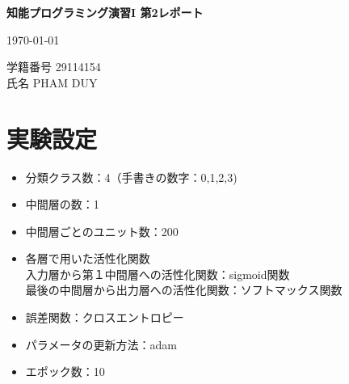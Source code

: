\documentclass{jarticle}
\begin{document}

\begin{center} 
{\large \bf 知能プログラミング演習I 第2レポート}
\end{center} %
\begin{flushright}
  \today
\end{flushright}
\begin{flushright}
\hskip 1mm
学籍番号 %
29114154 \\
\hskip 1mm
氏名 %
PHAM DUY
\end{flushright} %

\section{実験設定}
\begin{itemize}
  \item 分類クラス数：4（手書きの数字：0,1,2,3)
  \item 中間層の数：1
  \item 中間層ごとのユニット数：200
  \item 各層で用いた活性化関数\\
  入力層から第１中間層への活性化関数：sigmoid関数\\
  最後の中間層から出力層への活性化関数：ソフトマックス関数
  \item 誤差関数：クロスエントロピー
  \item パラメータの更新方法：adam
  \item エポック数：10
\end{itemize}


\end{document}
